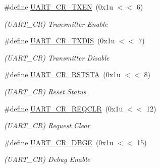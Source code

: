 \begin{DoxyCompactItemize}
\#define \mbox{\hyperlink{group__SAMV71__UART_ga8a305762b980c740221e6ead8d8aee87}{U\+A\+R\+T\+\_\+\+C\+R\+\_\+\+T\+X\+EN}}~(0x1u $<$$<$ 6)
\begin{DoxyCompactList}\small\item\em (U\+A\+R\+T\+\_\+\+CR) Transmitter Enable \end{DoxyCompactList}\item 
\mbox{\label{group__SAMV71__UART_gab822b68f656ad659006963366cd63ce1}} 
\#define \mbox{\hyperlink{group__SAMV71__UART_gab822b68f656ad659006963366cd63ce1}{U\+A\+R\+T\+\_\+\+C\+R\+\_\+\+T\+X\+D\+IS}}~(0x1u $<$$<$ 7)
\begin{DoxyCompactList}\small\item\em (U\+A\+R\+T\+\_\+\+CR) Transmitter Disable \end{DoxyCompactList}\item 
\mbox{\label{group__SAMV71__UART_gac3208ecbd03dcec5be5637b0b4e117ab}} 
\#define \mbox{\hyperlink{group__SAMV71__UART_gac3208ecbd03dcec5be5637b0b4e117ab}{U\+A\+R\+T\+\_\+\+C\+R\+\_\+\+R\+S\+T\+S\+TA}}~(0x1u $<$$<$ 8)
\begin{DoxyCompactList}\small\item\em (U\+A\+R\+T\+\_\+\+CR) Reset Status \end{DoxyCompactList}\item 
\mbox{\label{group__SAMV71__UART_gabed6a9339fd23c51f4a9c5106433db94}} 
\#define \mbox{\hyperlink{group__SAMV71__UART_gabed6a9339fd23c51f4a9c5106433db94}{U\+A\+R\+T\+\_\+\+C\+R\+\_\+\+R\+E\+Q\+C\+LR}}~(0x1u $<$$<$ 12)
\begin{DoxyCompactList}\small\item\em (U\+A\+R\+T\+\_\+\+CR) Request Clear \end{DoxyCompactList}\item 
\mbox{\label{group__SAMV71__UART_gaa2da28606d84ffa8b604ae7683ab7dcc}} 
\#define \mbox{\hyperlink{group__SAMV71__UART_gaa2da28606d84ffa8b604ae7683ab7dcc}{U\+A\+R\+T\+\_\+\+C\+R\+\_\+\+D\+B\+GE}}~(0x1u $<$$<$ 15)
\begin{DoxyCompactList}\small\item\em (U\+A\+R\+T\+\_\+\+CR) Debug Enable \end{DoxyCompactList}\item 
\mbox{\label{group__SAMV71__UART_gafcaf0ef4bfb31afe00020c8b7f15fe05}} 
$$
\end{DoxyCompactItemize}
